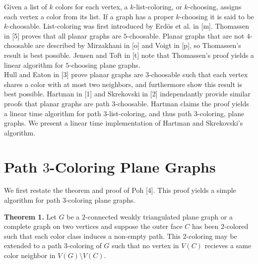 \documentclass[11pt,letter]{article}
\begin{document}
\noindent Given a list of $k$ colors for each vertex, a $k$-list-coloring, or $k$-choosing, assigns each vertex a
color from its list.
If a graph has a proper $k$-choosing it is said to be $k$-choosable. List-coloring was first introduced by
Erd{\"o}s et al. in [m]. Thomassen in [5] proves that all planar graphs are $5$-choosable. Planar
graphs that are not $4$-choosable are described by Mirzakhani in [o] and Voigt in [p], so Thomassen's result
is best possible. Jensen and Toft in [t] note that Thomassen's proof yields a linear algorithm for $5$-choosing
plane graphs.\\

\noindent Hull and Eaton in [3] prove planar graphs are $3$-choosable such that each vertex shares a color with
at most two neighbors, and furthermore show this result is best possible. Hartman in [1] and Skrekovski in [2]
independantly provide similar proofs that planar graphs are path $3$-choosable. Hartman claims the proof yields
a linear time algorithm for path $3$-list-coloring, and thus path $3$-coloring, plane graphs. We present a
linear time implementation of Hartman and Skrekovski's algorithm.

\section{Path $3$-Coloring Plane Graphs}

We first restate the theorem and proof of Poh [4]. This proof yields a simple algorithm for path $3$-coloring
plane graphs.\\

\begin{adjustwidth}{1.5em}{1.5em}
\noindent\textbf{Theorem 1.} Let $G$ be a $2$-connected weakly triangulated plane graph or a complete
graph on two vertices and
suppose the outer face $C$ has been $2$-colored such that each color class induces a non-empty path. This
$2$-coloring may be extended to a path $3$-coloring of $G$ such that no vertex in $V(C)$ recieves a same color
neighbor in $V(G)\setminus V(C)$.\\
\end{adjustwidth}
\end{document}
